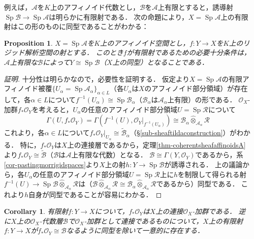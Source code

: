 \documentclass[a4paper,12pt, dvipdfmx]{jsbook}
\def\O{\mathscr{O}}
\def\til#1{\widetilde{#1}}%
\def\Sp{\mathop{\mathrm{Sp}}\nolimits}
\theoremstyle{plain}
\newtheorem{prop}[thm]{\bfseries Proposition}
\newtheorem{cor}[thm]{\bfseries Corollary}
\theoremstyle{definition}
\begin{document}
例えば，$\mathcal{A}$を$K$上のアフィノイド代数とし，$\mathcal{B}$を$\mathcal{A}$上有限とすると，誘導射$\Sp\mathcal{B}\rightarrow\Sp\mathcal{A}$は明らかに有限射である．
次の命題により，$X=\Sp\mathcal{A}$上の有限射はこの形のものに同型であることがわかる：
\begin{prop}\label{prop-finitemorphisms1}{\rm 
$X=\Sp\mathcal{A}$を$K$上のアフィノイド空間とし，$f\colon Y\rightarrow X$を$K$上のリジッド解析空間の射とする．
このとき$f$が有限射であるための必要十分条件は，$\mathcal{A}$上有限な$\mathcal{B}$によって$Y\cong\Sp\mathcal{B}$（$X$上の同型）となることである．}
\end{prop}

\begin{proof}[証明]
十分性は明らかなので，必要性を証明する．
仮定より$X=\Sp\mathcal{A}$の有限アフィノイド被覆$\{U_{\alpha}=\Sp\mathcal{A}_{\alpha}\}_{\alpha\in L}$（各$U_{\alpha}$は$X$のアフィノイド部分領域）が存在して，各$\alpha\in L$について$f^{-1}(U_{\alpha})\cong\Sp\mathcal{B}_{\alpha}$（$\mathcal{B}_{\alpha}$は$\mathcal{A}_{\alpha}$上有限）の形である．
$\O_X$-加群$f_{\ast}\O_Y$を考えると，$U_{\alpha}$の任意のアフィノイド部分領域$U=\Sp\mathcal{R}$について
$$
\Gamma(U,f_{\ast}\O_Y)=\Gamma(f^{-1}(U),\O_Y|_{f^{-1}(U_{\alpha})})\cong\mathcal{B}_{\alpha}\widehat{\otimes}_{\mathcal{A}_{\alpha}}\mathcal{R}
$$
これより，各$\alpha\in L$について$f_{\ast}\O_Y|_{U_{\alpha}}\cong\til{\mathcal{B}}_{\alpha}$（\S\ref{sub-sheaftildaconstruction}）がわかる．
特に，$f_{\ast}\O_Y$は$X$上の連接層であるから，定理\ref{thm-coherentsheafaffinoidsA}より$f_{\ast}\O_Y\cong\til{\mathcal{B}}$（$\mathcal{B}$は$\mathcal{A}$上有限な代数）となる．
$\mathcal{B}\cong\Gamma(Y,\O_Y)$であるから，系\ref{cor-pastingmorrigidspaces}より$X$上の射$h\colon Y\rightarrow\Sp\mathcal{B}$が誘導される．
上の議論から，各$U_{\alpha}$の任意のアフィノイド部分領域$U=\Sp\mathcal{R}$上に$h$を制限して得られる射$f^{-1}(U)\rightarrow\Sp\mathcal{B}\widehat{\otimes}_{\mathcal{A}_{\alpha}}\mathcal{R}$は（$\mathcal{B}\widehat{\otimes}_{\mathcal{A}_{\alpha}}\mathcal{R}\cong\mathcal{B}_{\alpha}\widehat{\otimes}_{\mathcal{A}_{\alpha}}\mathcal{R}$であるから）同型である．
これより$h$自身が同型であることが容易にわかる．
\end{proof}

\begin{cor}\label{cor-finitemorphisms2}{\rm 
有限射$f\colon Y\rightarrow X$について，$f_{\ast}\O_Y$は$X$上の連接$\O_X$-加群である．
逆に$X$上の$\O_X$-代数層$\mathscr{B}$で$\O_X$-加群として連接であるものについて，$X$上の有限射$f\colon Y\rightarrow X$が$f_{\ast}\O_Y\cong\mathscr{B}$なるように同型を除いて一意的に存在する．}
\end{cor}
\end{document}
